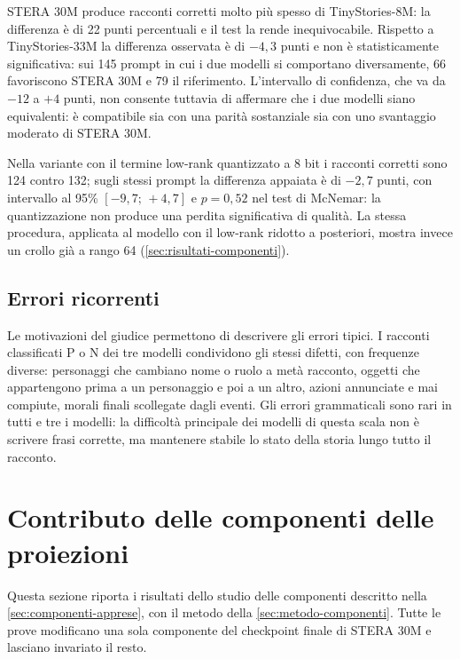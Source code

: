 STERA 30M produce racconti corretti molto più spesso di TinyStories-8M: la differenza è di 22 punti percentuali e il test la rende inequivocabile. Rispetto a TinyStories-33M la differenza osservata è di $-4{,}3$ punti e non è statisticamente significativa: sui 145 prompt in cui i due modelli si comportano diversamente, 66 favoriscono STERA 30M e 79 il riferimento. L'intervallo di confidenza, che va da $-12$ a $+4$ punti, non consente tuttavia di affermare che i due modelli siano equivalenti: è compatibile sia con una parità sostanziale sia con uno svantaggio moderato di STERA 30M.

Nella variante con il termine low-rank quantizzato a 8 bit i racconti corretti sono 124 contro 132; sugli stessi prompt la differenza appaiata è di $-2{,}7$ punti, con intervallo al 95\% $[-9{,}7;\,+4{,}7]$ e $p=0{,}52$ nel test di McNemar: la quantizzazione non produce una perdita significativa di qualità. La stessa procedura, applicata al modello con il low-rank ridotto a posteriori, mostra invece un crollo già a rango 64 (\autoref{sec:risultati-componenti}).

\subsection{Errori ricorrenti}

Le motivazioni del giudice permettono di descrivere gli errori tipici. I racconti classificati P o N dei tre modelli condividono gli stessi difetti, con frequenze diverse: personaggi che cambiano nome o ruolo a metà racconto, oggetti che appartengono prima a un personaggio e poi a un altro, azioni annunciate e mai compiute, morali finali scollegate dagli eventi. Gli errori grammaticali sono rari in tutti e tre i modelli: la difficoltà principale dei modelli di questa scala non è scrivere frasi corrette, ma mantenere stabile lo stato della storia lungo tutto il racconto.

\section{Contributo delle componenti delle proiezioni}
\label{sec:risultati-componenti}

Questa sezione riporta i risultati dello studio delle componenti descritto nella \autoref{sec:componenti-apprese}, con il metodo della \autoref{sec:metodo-componenti}. Tutte le prove modificano una sola componente del checkpoint finale di STERA 30M e lasciano invariato il resto.

